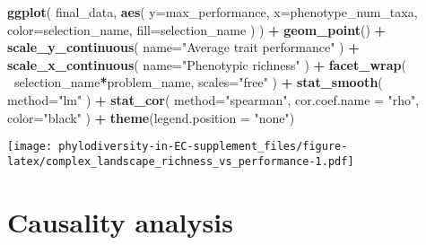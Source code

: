 \documentclass[]{book}
\newenvironment{Shaded}{\begin{snugshade}}{\end{snugshade}}
\newcommand{\DataTypeTok}[1]{\textcolor[rgb]{0.13,0.29,0.53}{#1}}
\newcommand{\KeywordTok}[1]{\textcolor[rgb]{0.13,0.29,0.53}{\textbf{#1}}}
\newcommand{\NormalTok}[1]{#1}
\newcommand{\OperatorTok}[1]{\textcolor[rgb]{0.81,0.36,0.00}{\textbf{#1}}}
\newcommand{\StringTok}[1]{\textcolor[rgb]{0.31,0.60,0.02}{#1}}
\begin{document}
\begin{Shaded}
\begin{Highlighting}[]
\KeywordTok{ggplot}\NormalTok{(}
\NormalTok{    final_data,}
    \KeywordTok{aes}\NormalTok{(}
        \DataTypeTok{y=}\NormalTok{max_performance,}
        \DataTypeTok{x=}\NormalTok{phenotype_num_taxa,}
        \DataTypeTok{color=}\NormalTok{selection_name,}
        \DataTypeTok{fill=}\NormalTok{selection_name}
\NormalTok{    )}
\NormalTok{  ) }\OperatorTok{+}
\StringTok{  }\KeywordTok{geom_point}\NormalTok{() }\OperatorTok{+}
\StringTok{    }\KeywordTok{scale_y_continuous}\NormalTok{(}
        \DataTypeTok{name=}\StringTok{"Average trait performance"}
\NormalTok{  ) }\OperatorTok{+}
\StringTok{  }\KeywordTok{scale_x_continuous}\NormalTok{(}
        \DataTypeTok{name=}\StringTok{"Phenotypic richness"}
\NormalTok{  ) }\OperatorTok{+}\StringTok{ }
\StringTok{  }\KeywordTok{facet_wrap}\NormalTok{(}
      \OperatorTok{~}\NormalTok{selection_name}\OperatorTok{*}\NormalTok{problem_name, }\DataTypeTok{scales=}\StringTok{"free"}
\NormalTok{  ) }\OperatorTok{+}\StringTok{ }
\StringTok{  }\KeywordTok{stat_smooth}\NormalTok{(}
    \DataTypeTok{method=}\StringTok{"lm"}
\NormalTok{  ) }\OperatorTok{+}\StringTok{ }
\StringTok{  }\KeywordTok{stat_cor}\NormalTok{(}
    \DataTypeTok{method=}\StringTok{"spearman"}\NormalTok{, }\DataTypeTok{cor.coef.name =} \StringTok{"rho"}\NormalTok{, }\DataTypeTok{color=}\StringTok{"black"}
\NormalTok{  ) }\OperatorTok{+}
\StringTok{  }\KeywordTok{theme}\NormalTok{(}\DataTypeTok{legend.position =} \StringTok{"none"}\NormalTok{)}
\end{Highlighting}
\end{Shaded}

\texttt{[image: phylodiversity-in-EC-supplement\_files/figure-latex/complex\_landscape\_richness\_vs\_performance-1.pdf]}

\hypertarget{causality-analysis-1}{%
\section{Causality analysis}\label{causality-analysis-1}}
\end{document}
